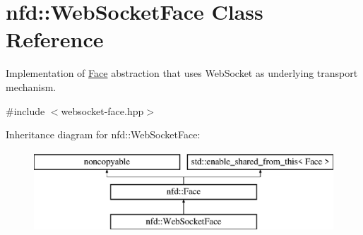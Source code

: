\hypertarget{classnfd_1_1WebSocketFace}{}\section{nfd\+:\+:Web\+Socket\+Face Class Reference}
\label{classnfd_1_1WebSocketFace}


Implementation of \hyperlink{classnfd_1_1Face}{Face} abstraction that uses Web\+Socket as underlying transport mechanism.  




{\ttfamily \#include $<$websocket-\/face.\+hpp$>$}

Inheritance diagram for nfd\+:\+:Web\+Socket\+Face\+:\begin{figure}[H]
\begin{center}
\leavevmode
\includegraphics[height=3.000000cm]{classnfd_1_1WebSocketFace}
\end{center}
\end{figure}
